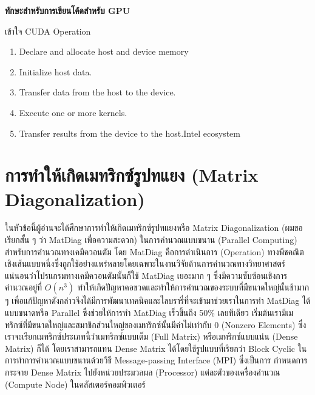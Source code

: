 \noindent \textbf{ทักษะสำหรับการเขียนโค้ดสำหรับ GPU}

เข้าใจ CUDA Operation
\begin{enumerate}[topsep=0pt,noitemsep]
  \setlength\itemsep{0.5em}
  \item Declare and allocate host and device memory
  
  \item Initialize host data.
  
  \item Transfer data from the host to the device.
  
  \item Execute one or more kernels.
  
  \item Transfer results from the device to the host.Intel ecosystem
\end{enumerate}

\section{การทำให้เกิดเมทริกซ์รูปทแยง (Matrix Diagonalization)}

ในหัวข้อนี้ผู้อ่านจะได้ศึกษาการทำให้เกิดเมทริกซ์รูปทแยงหรือ Matrix Diagonalization (ผมขอเรียกสั้น ๆ ว่า MatDiag เพื่อความสะดวก)
ในการคำนวณแบบขนาน (Parallel Computing) สำหรับการคำนวณทางเคมีควอนตัม โดย MatDiag คือการดำเนินการ (Operation)
ทางพีชคณิตเชิงเส้นแบบหนึ่งซึ่งถูกใช้อย่างแพร่หลายโดยเฉพาะในงานวิจัยด้านการคำนวณทางวิทยาศาสตร์ แน่นอนว่าโปรแกรมทางเคมีควอนตัมนั้นก็ใช้
MatDiag เยอะมาก ๆ ซึ่งมีความซับซ้อนเชิงการคำนวณอยู่ที่ $O(n^3)$ ทำให้เกิดปัญหาคอขวดและทำให้การคำนวณของระบบที่มีขนาดใหญ่นั้นช้ามาก ๆ
เพื่อแก้ปัญหาดังกล่าวจึงได้มีการพัฒนาเทคนิคและไลบรารี่ที่จะเข้ามาช่วยเราในการทำ MatDiag ได้แบบขนาดหรือ Parallel ซึ่งช่วยให้การทำ
MatDiag เร็วขึ้นถึง 50\% เลยทีเดียว เริ่มต้นเรามีเมทริกซ์ที่มีขนาดใหญ่และสมาชิกส่วนใหญ่ของเมทริกซ์นั้นมีค่าไม่เท่ากับ 0 (Nonzero Elements)
ซึ่งเราจะเรียกเมทริกซ์ประเภทนี้ว่าเมทริกซ์แบบเต็ม (Full Matrix) หรือเมทริกซ์แบบแน่น (Dense Matrix) ก็ได้ โดยเราสามารถแทน Dense
Matrix ได้โดยใช้รูปแบบที่เรียกว่า Block Cyclic ในการทำการคำนวณแบบขนานด้วยวิธี Message-passing Interface (MPI) ซึ่งเป็นการ%
กำหนดการกระจาย Dense Matrix ไปยังหน่วยประมวลผล (Processor) แต่ละตัวของเครื่องคำนวณ (Compute Node) ในคลัสเตอร์คอมพิวเตอร์



